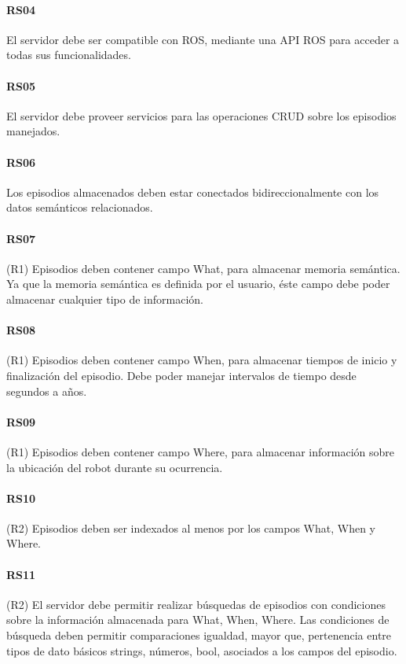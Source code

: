 \paragraph{RS04}
El servidor debe ser compatible con ROS, mediante una API ROS para acceder a todas sus funcionalidades.

\paragraph{RS05}
El servidor debe proveer servicios para las operaciones CRUD sobre los episodios manejados.

\paragraph{RS06}
Los episodios almacenados deben estar conectados bidireccionalmente con los datos semánticos relacionados.

\paragraph{RS07}
(R1) Episodios deben contener campo What, para almacenar memoria semántica. Ya que la memoria semántica es definida por el usuario, éste campo debe poder almacenar cualquier tipo de información.

\paragraph{RS08}
(R1) Episodios deben contener campo When, para almacenar tiempos de inicio y finalización del episodio. Debe poder manejar intervalos de tiempo desde segundos a años.

\paragraph{RS09}
(R1) Episodios deben contener campo Where, para almacenar información sobre la ubicación del robot durante su ocurrencia.

\paragraph{RS10}
(R2) Episodios deben ser indexados al menos por los campos What, When y Where.

\paragraph{RS11}
(R2) El servidor debe permitir realizar búsquedas de episodios con condiciones sobre la información almacenada para What, When, Where. Las condiciones de búsqueda deben permitir comparaciones {igualdad, mayor que, pertenencia} entre tipos de dato básicos {strings, números, bool}, asociados a los campos del episodio.

